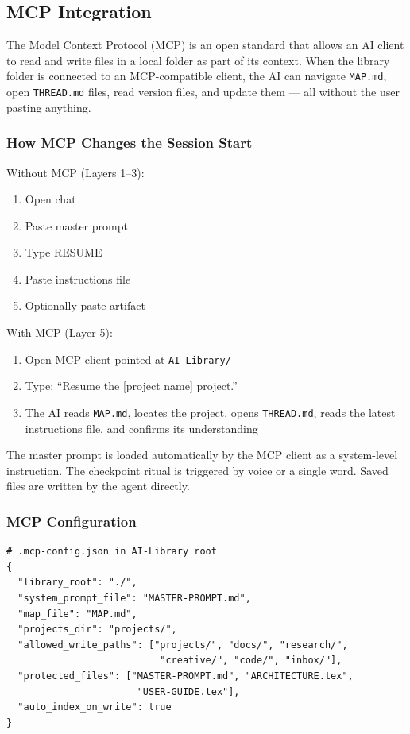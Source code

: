\documentclass[12pt,letterpaper]{article}
\begin{document}
\subsection{MCP Integration}

The Model Context Protocol (MCP) is an open standard that allows an AI
client to read and write files in a local folder as part of its context.
When the library folder is connected to an MCP-compatible client, the AI
can navigate \texttt{MAP.md}, open \texttt{THREAD.md} files, read version
files, and update them --- all without the user pasting anything.

\subsubsection{How MCP Changes the Session Start}

Without MCP (Layers 1--3):

\begin{enumerate}
  \item Open chat
  \item Paste master prompt
  \item Type RESUME
  \item Paste instructions file
  \item Optionally paste artifact
\end{enumerate}

With MCP (Layer 5):

\begin{enumerate}
  \item Open MCP client pointed at \texttt{AI-Library/}
  \item Type: ``Resume the [project name] project.''
  \item The AI reads \texttt{MAP.md}, locates the project, opens
        \texttt{THREAD.md}, reads the latest instructions file,
        and confirms its understanding
\end{enumerate}

The master prompt is loaded automatically by the MCP client as a
system-level instruction. The checkpoint ritual is triggered by voice
or a single word. Saved files are written by the agent directly.

\subsubsection{MCP Configuration}

\begin{lstlisting}
# .mcp-config.json in AI-Library root
{
  "library_root": "./",
  "system_prompt_file": "MASTER-PROMPT.md",
  "map_file": "MAP.md",
  "projects_dir": "projects/",
  "allowed_write_paths": ["projects/", "docs/", "research/",
                           "creative/", "code/", "inbox/"],
  "protected_files": ["MASTER-PROMPT.md", "ARCHITECTURE.tex",
                       "USER-GUIDE.tex"],
  "auto_index_on_write": true
}
\end{lstlisting}
\end{document}
